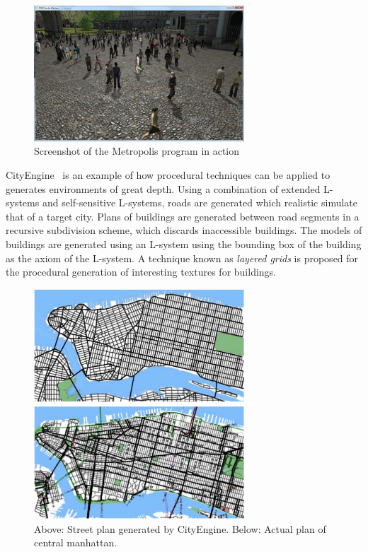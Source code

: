 \documentclass[12pt]{article}
\begin{document}
\begin{figure}
  \centering
    \includegraphics[width=0.7\textwidth]{images/metropolis}
  \caption{Screenshot of the Metropolis program in action}
\end{figure}

CityEngine~\cite{parish2001procedural} is an example of how procedural techniques can be applied to generates environments of great depth.
Using a combination of extended L-systems and self-sensitive L-systems, roads are generated which realistic simulate that of a target city.
Plans of buildings are generated between road segments in a recursive subdivision scheme, which discards inaccessible buildings.
The models of buildings are generated using an L-system using the bounding box of the building as the axiom of the L-system.
A technique known as \emph{layered grids} is proposed for the procedural generation of interesting textures for buildings.

\begin{figure}
  \centering
    \includegraphics[width=0.7\textwidth]{images/cityengine}
  \caption{Above: Street plan generated by CityEngine. Below: Actual plan of central manhattan.}
\end{figure}
\end{document}
